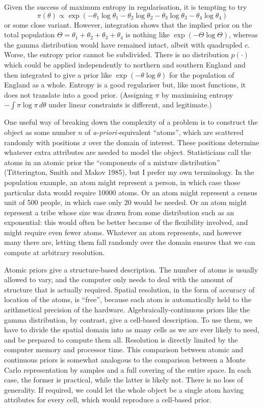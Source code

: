 Given the success of maximum entropy in regularisation, it is tempting to try
$$
  \pi(\theta) \propto
         \exp( - \theta_1 \log\theta_1 - \theta_2 \log\theta_2
               - \theta_3 \log\theta_3 - \theta_4 \log\theta_4 )
$$
or some close variant.  However, integration shows that the implied prior on the total population $\Theta = \theta_1 + \theta_2 + \theta_3 + \theta_4$ 
is nothing like $\exp( - \Theta \log\Theta)$, whereas the gamma distribution would have remained intact, albeit with quadrupled $c$. 
Worse, the entropy prior cannot be subdivided.
There is no distribution $p(\cdot)$ which could be applied independently to northern and southern England and then integrated to give a prior 
like $\exp( - \theta \log\theta )$ for the population of England as a whole.
Entropy is a good regulariser but, like most functions, it does not translate into a good prior.
(Assigning $\pi$ by maximising entropy $-\int\pi\log\pi\,d\theta$ under linear constraints is different, and legitimate.)

\bigskip
{}
\smallskip

One useful way of breaking down the complexity of a problem is to construct the object as some number $n$ of {\it a-priori-}equivalent ``atoms'', 
which are scattered randomly with positions $x$ over the domain of interest.  
These positions determine whatever extra attributes are needed to model the object. 
Statisticians call the atoms in an atomic prior the ``components of a mixture distribution'' (Titterington, Smith and Makov 1985), but I prefer my own terminology. 
In the population example, an atom might represent a person, in which case those particular data would require 10000 atoms. 
Or an atom might represent a census unit of 500 people, in which case only 20 would be needed.  
Or an atom might represent a tribe whose size was drawn from some distribution such as an exponential: 
this would often be better because of the flexibility involved, and might require even fewer atoms.  
Whatever an atom represents, and however many there are, letting them fall randomly over the domain ensures that we can compute at arbitrary resolution.

Atomic priors give a structure-based description.  
The number of atoms is usually allowed to vary, and the computer only needs to deal with the amount of structure that is actually required.
Spatial resolution, in the form of accuracy of location of the atoms, is ``free'', 
because each atom is automatically held to the arithmetical precision of the hardware.  
Algebraically-continuous priors like the gamma distribution, by contrast, give a cell-based description.
To use them, we have to divide the spatial domain into as many cells as we are ever likely to need, and be prepared to compute them all.
Resolution is directly limited by the computer memory and processor time.
This comparison between atomic and continuous priors is somewhat analogous to the comparison between a Monte Carlo representation by samples 
and a full covering of the entire space. 
In each case, the former is practical, while the latter is likely not.  
There is no loss of generality.
If required, we could let the whole object be a single atom having attributes for every cell, which would reproduce a cell-based prior.

